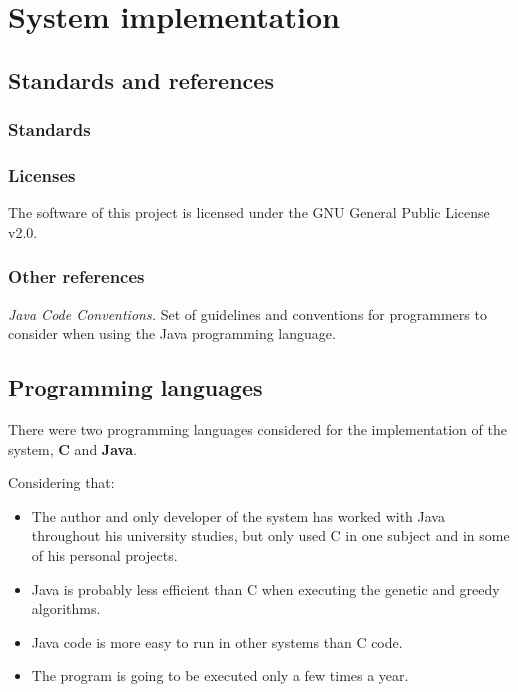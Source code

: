 \renewcommand{\documentname}{System implementation}

\chapter{System implementation}


\section{Standards and references}

\subsection{Standards}

\subsection{Licenses}

The software of this project is licensed under the GNU General Public License v2.0.

\subsection{Other references}

\textit{Java Code Conventions.} Set of guidelines and conventions for programmers to consider when using the Java programming language.


\section{Programming languages}

There were two programming languages considered for the implementation of the system, \textbf{C} and \textbf{Java}.

Considering that:

\begin{itemize}
    \item The author and only developer of the system has worked with Java throughout his university studies, but only used C in one subject and in some of his personal projects.

    \item Java is probably less efficient than C when executing the genetic and greedy algorithms.

    \item Java code is more easy to run in other systems than C code.

    \item The program is going to be executed only a few times a year.
\end{itemize}

